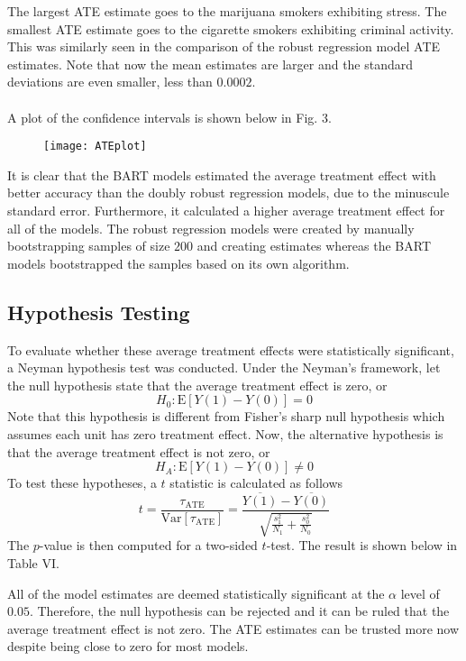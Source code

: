 \documentclass[a4paper, 10pt, conference]{ieeeconf}
\begin{document}
The largest ATE estimate goes to the marijuana smokers exhibiting stress. The smallest ATE estimate goes to the cigarette smokers exhibiting criminal activity. This was similarly seen in the comparison of the robust regression model ATE estimates. Note that now the mean estimates are larger and the standard deviations are even smaller, less than $0.0002$.
\\~\\
A plot of the confidence intervals is shown below in Fig. 3.
\begin{figure} \texttt{[image: ATEplot]} \end{figure}
It is clear that the BART models estimated the average treatment effect with better accuracy than the doubly robust regression models, due to the minuscule standard error. Furthermore, it calculated a higher average treatment effect for all of the models. The robust regression models were created by manually bootstrapping samples of size $200$ and creating estimates whereas the BART models bootstrapped the samples based on its own algorithm. 

\subsection{Hypothesis Testing}
To evaluate whether these average treatment effects were statistically significant, a Neyman hypothesis test was conducted. Under the Neyman's framework, let the null hypothesis state that the average treatment effect is zero, or 
$$ H_0: \mathrm{E}[Y(1) - Y(0)] = 0 $$ Note that this hypothesis is different from Fisher's sharp null hypothesis which assumes each unit has zero treatment effect. Now, the alternative hypothesis is that the average treatment effect is not zero, or $$ H_A: \mathrm{E}[Y(1) - Y(0)] \neq 0 $$ To test these hypotheses, a $t$ statistic is calculated as follows
$$ t = \frac{\tau_{\text{ATE}}}{\text{Var}[\tau_{\text{ATE}}]} = \frac{\overline{Y(1)} - \overline{Y(0)}}{\sqrt{ \frac{s_1^2}{N_1} + \frac{s_0^2}{N_0}}} $$ The $p$-value is then computed for a two-sided $t$-test.  The result is shown below in Table VI.
 

All of the model estimates are deemed statistically significant at the $\alpha$ level of $0.05$. Therefore, the null hypothesis can be rejected and it can be ruled that the average treatment effect is not zero. The ATE estimates can be trusted more now despite being close to zero for most models.
\end{document}

